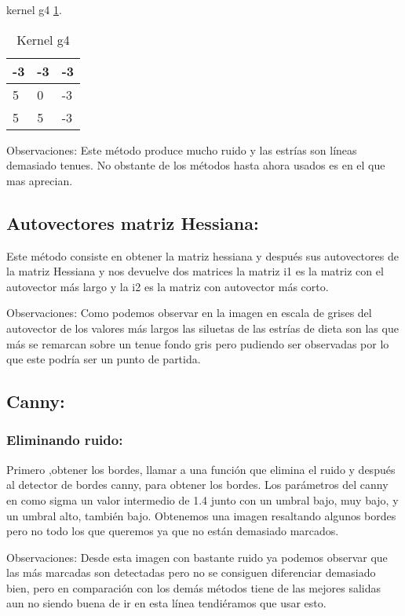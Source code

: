 kernel g4 \ref{F_k6_4}.

\begin{table}[]
	\centering
	\caption{Kernel g4}
	\label{F_k6_4}
	\begin{tabular}{|l|l|l|}
		\hline
		-3  & -3 & -3  \\ \hline
		5 & 0  & -3 \\ \hline
		5 & 5 & -3 \\ \hline
	\end{tabular}
\end{table}
Observaciones:
Este método produce mucho ruido y las estrías son líneas demasiado tenues.
No obstante de los métodos hasta ahora usados es en el que mas aprecian.

\subsection{Autovectores matriz Hessiana:}
Este método consiste en obtener la matriz hessiana y después sus autovectores de la matriz Hessiana y nos devuelve dos matrices la matriz i1 es la matriz con el autovector más largo y la i2 es la matriz con autovector más corto.





Observaciones: 
Como podemos observar en la imagen en escala de grises del autovector de los valores más largos las siluetas de las estrías de dieta son las que más se remarcan sobre un tenue fondo gris pero pudiendo ser observadas por lo que este podría ser un punto de partida.



\subsection{Canny:}

\subsubsection{Eliminando ruido:}
Primero ,obtener los bordes, llamar a una función que elimina el ruido y después al detector de bordes canny, para obtener los bordes.
Los parámetros del canny en como sigma un valor intermedio de 1.4 junto con un umbral bajo, muy bajo, y un umbral alto, también bajo.
Obtenemos una imagen resaltando algunos bordes pero no todo los que queremos ya que no están demasiado marcados.




Observaciones:
Desde esta imagen con bastante ruido ya podemos observar que las más marcadas son detectadas pero no se consiguen diferenciar demasiado bien, pero en comparación con los demás métodos tiene de las mejores salidas aun no siendo buena de ir en esta línea tendiéramos que usar esto.

